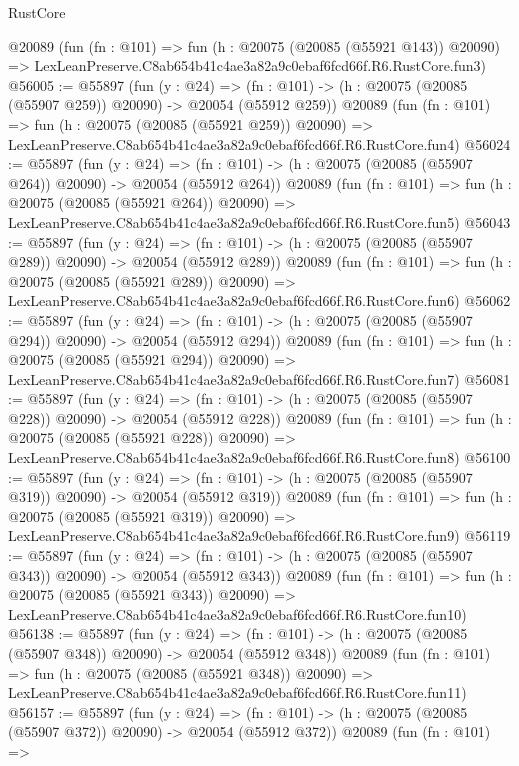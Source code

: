 \begin{lexlean}{RustCore}
\begin{coremodule}
    @20089
    (fun (fn : @101) =>
    fun (h : @20075 (@20085 (@55921 @143)) @20090) =>
    LexLeanPreserve.C8ab654b41c4ae3a82a9c0ebaf6fcd66f.R6.RustCore.fun3)
@56005 := @55897
    (fun (y : @24) =>
    (fn : @101) -> (h : @20075 (@20085 (@55907 @259)) @20090) -> @20054 (@55912 @259))
    @20089
    (fun (fn : @101) =>
    fun (h : @20075 (@20085 (@55921 @259)) @20090) =>
    LexLeanPreserve.C8ab654b41c4ae3a82a9c0ebaf6fcd66f.R6.RustCore.fun4)
@56024 := @55897
    (fun (y : @24) =>
    (fn : @101) -> (h : @20075 (@20085 (@55907 @264)) @20090) -> @20054 (@55912 @264))
    @20089
    (fun (fn : @101) =>
    fun (h : @20075 (@20085 (@55921 @264)) @20090) =>
    LexLeanPreserve.C8ab654b41c4ae3a82a9c0ebaf6fcd66f.R6.RustCore.fun5)
@56043 := @55897
    (fun (y : @24) =>
    (fn : @101) -> (h : @20075 (@20085 (@55907 @289)) @20090) -> @20054 (@55912 @289))
    @20089
    (fun (fn : @101) =>
    fun (h : @20075 (@20085 (@55921 @289)) @20090) =>
    LexLeanPreserve.C8ab654b41c4ae3a82a9c0ebaf6fcd66f.R6.RustCore.fun6)
@56062 := @55897
    (fun (y : @24) =>
    (fn : @101) -> (h : @20075 (@20085 (@55907 @294)) @20090) -> @20054 (@55912 @294))
    @20089
    (fun (fn : @101) =>
    fun (h : @20075 (@20085 (@55921 @294)) @20090) =>
    LexLeanPreserve.C8ab654b41c4ae3a82a9c0ebaf6fcd66f.R6.RustCore.fun7)
@56081 := @55897
    (fun (y : @24) =>
    (fn : @101) -> (h : @20075 (@20085 (@55907 @228)) @20090) -> @20054 (@55912 @228))
    @20089
    (fun (fn : @101) =>
    fun (h : @20075 (@20085 (@55921 @228)) @20090) =>
    LexLeanPreserve.C8ab654b41c4ae3a82a9c0ebaf6fcd66f.R6.RustCore.fun8)
@56100 := @55897
    (fun (y : @24) =>
    (fn : @101) -> (h : @20075 (@20085 (@55907 @319)) @20090) -> @20054 (@55912 @319))
    @20089
    (fun (fn : @101) =>
    fun (h : @20075 (@20085 (@55921 @319)) @20090) =>
    LexLeanPreserve.C8ab654b41c4ae3a82a9c0ebaf6fcd66f.R6.RustCore.fun9)
@56119 := @55897
    (fun (y : @24) =>
    (fn : @101) -> (h : @20075 (@20085 (@55907 @343)) @20090) -> @20054 (@55912 @343))
    @20089
    (fun (fn : @101) =>
    fun (h : @20075 (@20085 (@55921 @343)) @20090) =>
    LexLeanPreserve.C8ab654b41c4ae3a82a9c0ebaf6fcd66f.R6.RustCore.fun10)
@56138 := @55897
    (fun (y : @24) =>
    (fn : @101) -> (h : @20075 (@20085 (@55907 @348)) @20090) -> @20054 (@55912 @348))
    @20089
    (fun (fn : @101) =>
    fun (h : @20075 (@20085 (@55921 @348)) @20090) =>
    LexLeanPreserve.C8ab654b41c4ae3a82a9c0ebaf6fcd66f.R6.RustCore.fun11)
@56157 := @55897
    (fun (y : @24) =>
    (fn : @101) -> (h : @20075 (@20085 (@55907 @372)) @20090) -> @20054 (@55912 @372))
    @20089
    (fun (fn : @101) =>

\end{coremodule}
\end{lexlean}
